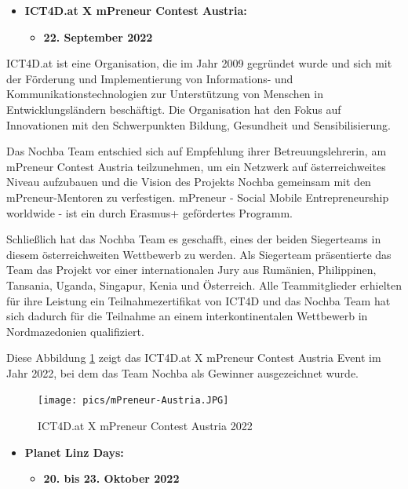 \begin{itemize}
    \item \textbf{ICT4D.at X mPreneur Contest Austria:}
          \begin{itemize}
              \item \textbf{22. September 2022}
          \end{itemize}
\end{itemize}

ICT4D.at \cite{ict4d} ist eine Organisation, die im Jahr 2009 gegründet wurde und sich mit der Förderung und Implementierung von Informations- und Kommunikationstechnologien zur Unterstützung von Menschen in Entwicklungsländern beschäftigt. Die Organisation hat den Fokus auf Innovationen mit den Schwerpunkten Bildung, Gesundheit und Sensibilisierung.

Das Nochba Team entschied sich auf Empfehlung ihrer Betreuungslehrerin, am mPreneur Contest Austria teilzunehmen, um ein Netzwerk auf österreichweites Niveau aufzubauen und die Vision des Projekts Nochba gemeinsam mit den mPreneur-Mentoren zu verfestigen. mPreneur - Social Mobile Entrepreneurship worldwide - ist ein durch Erasmus+ gefördertes Programm.

Schließlich hat das Nochba Team es geschafft, eines der beiden Siegerteams in diesem österreichweiten Wettbewerb zu werden. Als Siegerteam präsentierte das Team das Projekt vor einer internationalen Jury aus Rumänien, Philippinen, Tansania, Uganda, Singapur, Kenia und Österreich. Alle Teammitglieder erhielten für ihre Leistung ein Teilnahmezertifikat von ICT4D und das Nochba Team hat sich dadurch für die Teilnahme an einem interkontinentalen Wettbewerb in Nordmazedonien qualifiziert.

Diese Abbildung \ref{fig:mpreneur} zeigt das ICT4D.at X mPreneur Contest Austria Event im Jahr 2022, bei dem das Team Nochba als Gewinner ausgezeichnet wurde.

\begin{figure}[H]
    \centering
    \texttt{[image: pics/mPreneur-Austria.JPG]}
    \caption{ICT4D.at X mPreneur Contest Austria 2022}
    \label{fig:mpreneur}
\end{figure}

\begin{itemize}
    \item \textbf{Planet Linz Days:}
          \begin{itemize}
              \item \textbf{20. bis 23. Oktober 2022}
          \end{itemize}
\end{itemize}

